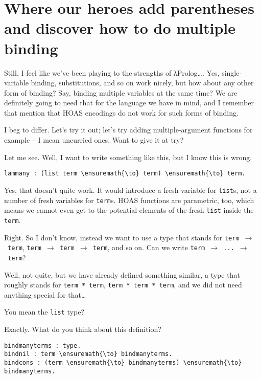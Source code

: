\section{Where our heroes add parentheses and discover how to do
multiple
binding}\label{where-our-heroes-add-parentheses-and-discover-how-to-do-multiple-binding}

\heroSTUDENT{} Still, I feel like we've been playing to the strengths of
\foreignlanguage{greek}{λ}Prolog\ldots{}. Yes, single-variable binding, substitutions, and so on
work nicely, but how about any other form of binding? Say, binding
multiple variables at the same time? We are definitely going to need
that for the language we have in mind, and I remember that
\citet{keuchel2016needle} mention that HOAS encodings do not work for
such forms of binding.

\heroADVISOR{} I beg to differ. Let's try it out; let's try adding
multiple-argument functions for example -- I mean uncurried ones. Want
to give it at try?

\heroSTUDENT{} Let me see. Well, I want to write something like this, but I
know this is wrong.

\begin{verbatim}
lammany : (list term \ensuremath{\to} term) \ensuremath{\to} term.
\end{verbatim}

\heroADVISOR{} Yes, that doesn't quite work. It would introduce a fresh
variable for \texttt{list}s, not a number of fresh variables for
\texttt{term}s. HOAS functions are parametric, too, which means we
cannot even get to the potential elements of the fresh \texttt{list}
inside the \texttt{term}.

\heroSTUDENT{} Right. So I don't know, instead we want to use a type that
stands for \texttt{term\ \ensuremath{\to}\ term},
\texttt{term\ \ensuremath{\to}\ term\ \ensuremath{\to}\ term}, and so on.
Can we write \texttt{term\ \ensuremath{\to}\ ...\ \ensuremath{\to}\ term}?

\heroADVISOR{} Well, not quite, but we have already defined something similar,
a type that roughly stands for \texttt{term\ *\ term},
\texttt{term\ *\ term\ *\ term}, and we did not need anything special
for that\ldots{}

\heroSTUDENT{} You mean the \texttt{list} type?

\heroADVISOR{} Exactly. What do you think about this definition?

\begin{verbatim}
bindmanyterms : type.
bindnil : term \ensuremath{\to} bindmanyterms.
bindcons : (term \ensuremath{\to} bindmanyterms) \ensuremath{\to} bindmanyterms.
\end{verbatim}

